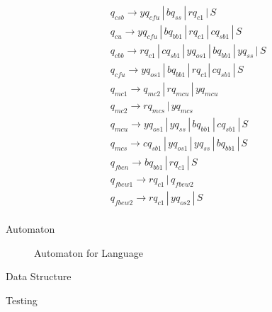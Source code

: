 \documentclass{article}
\begin{document}
\begin{mylist}
\begin{align*}
&q_{csb} \rightarrow yq_{cfu} \, | \,  bq_{ss} \, | \, rq_{c1} \, | \, S \\ 
&q_{cu} \rightarrow yq_{cfu} \, | \,  bq_{bb1} \, | \, rq_{c1} \, | \, cq_{sb1} \, | \, S \\ 
&q_{cbb} \rightarrow rq_{c1} \, | \,  cq_{sb1} \, | \, yq_{os1} \, | \, bq_{bb1} \, | \, yq_{ss} \, | \, S \\ 
&q_{cfu} \rightarrow yq_{os1} \, | \,  bq_{bb1} \, | \, rq_{c1} | \, cq_{sb1} \, | \, S\\ 
&q_{mc1} \rightarrow q_{mc2} \, | \, rq_{mcu} \, | \, yq_{mcu}\\
&q_{mc2} \rightarrow rq_{mcs} \, | \, yq_{mcs}\\
&q_{mcu} \rightarrow yq_{os1} \, | \, yq_{ss} \, | \, bq_{bb1} \, | \, cq_{sb1} \, | \, S\\
&q_{mcs} \rightarrow cq_{sb1} \, | \, yq_{os1} \, | \, yq_{ss} \, | \, bq_{bb1}\, | \, S\\
&q_{fben} \rightarrow bq_{bb1} \, | \, rq_{c1} \, | \, S\\
&q_{fbew1} \rightarrow rq_{c1} \, | \, q_{fbew2} \\
&q_{fbew2} \rightarrow rq_{c1} \, | \, yq_{os2} \, | \, S\\
\end{align*}

\newpage
\item Automaton

\begin{center}

\begin{figure}[ht]
    \centering
    \caption{Automaton for Language}
    \label{fig1:automaton-for-language}
\end{figure}

\end{center}

\newpage
\item Data Structure

\item Testing

\end{mylist}
\end{document}
